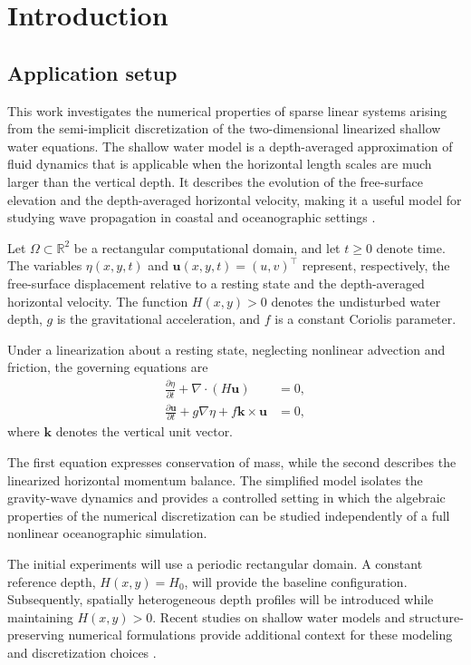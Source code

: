 \section{Introduction}

\subsection{Application setup}

This work investigates the numerical properties of sparse linear
systems arising from the semi-implicit discretization of the
two-dimensional linearized shallow water equations. The shallow
water model is a depth-averaged approximation of fluid dynamics
that is applicable when the horizontal length scales are much
larger than the vertical depth. It describes the evolution of
the free-surface elevation and the depth-averaged horizontal
velocity, making it a useful model for studying wave propagation
in coastal and oceanographic settings
\cite{casulli1990,chopra2025}.

Let $\Omega\subset\mathbb{R}^2$ be a rectangular computational
domain, and let $t\geq 0$ denote time. The variables
$\eta(x,y,t)$ and $\mathbf{u}(x,y,t)=(u,v)^\top$ represent,
respectively, the free-surface displacement relative to a resting
state and the depth-averaged horizontal velocity. The function
$H(x,y)>0$ denotes the undisturbed water depth, $g$ is the
gravitational acceleration, and $f$ is a constant Coriolis
parameter.

Under a linearization about a resting state, neglecting nonlinear
advection and friction, the governing equations are
\begin{align}
    \frac{\partial \eta}{\partial t}
    + \nabla\cdot(H\mathbf{u})    & = 0,
    \label{eq:swe_continuity}
    \\
    \frac{\partial \mathbf{u}}{\partial t}
    + g\nabla\eta
    + f\mathbf{k}\times\mathbf{u} & = 0,
    \label{eq:swe_momentum}
\end{align}
where $\mathbf{k}$ denotes the vertical unit vector.

The first equation expresses conservation of mass, while the
second describes the linearized horizontal momentum balance.
The simplified model isolates the gravity-wave dynamics and
provides a controlled setting in which the algebraic properties
of the numerical discretization can be studied independently
of a full nonlinear oceanographic simulation.

The initial experiments will use a periodic rectangular domain.
A constant reference depth, $H(x,y)=H_0$, will provide the
baseline configuration. Subsequently, spatially heterogeneous
depth profiles will be introduced while maintaining
$H(x,y)>0$. Recent studies on shallow water models and
structure-preserving numerical formulations provide additional
context for these modeling and discretization choices
\cite{cardosoribeiro2024,chopra2025}.

